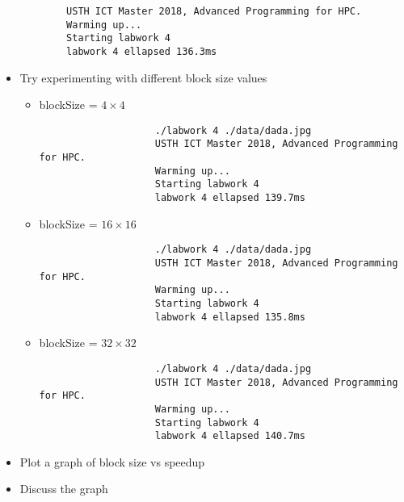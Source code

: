 \documentclass[10pt, a4paper]{article}
\begin{document}
\begin{itemize}
\begin{verbatim}
        USTH ICT Master 2018, Advanced Programming for HPC.
        Warming up...
        Starting labwork 4
        labwork 4 ellapsed 136.3ms
    \end{verbatim}
    
    \item Try experimenting with different block size values
        \begin{itemize}
            \item blockSize = $4\times4$
                \begin{verbatim}
                    ./labwork 4 ./data/dada.jpg
                    USTH ICT Master 2018, Advanced Programming for HPC.
                    Warming up...
                    Starting labwork 4
                    labwork 4 ellapsed 139.7ms
                \end{verbatim}
            \item blockSize = $16\times16$
                \begin{verbatim}
                    ./labwork 4 ./data/dada.jpg
                    USTH ICT Master 2018, Advanced Programming for HPC.
                    Warming up...
                    Starting labwork 4
                    labwork 4 ellapsed 135.8ms
                \end{verbatim}
            \item blockSize = $32\times32$
                \begin{verbatim}
                    ./labwork 4 ./data/dada.jpg
                    USTH ICT Master 2018, Advanced Programming for HPC.
                    Warming up...
                    Starting labwork 4
                    labwork 4 ellapsed 140.7ms
                \end{verbatim}
        \end{itemize}
        
        
    
    \item Plot a graph of block size vs speedup
    \item Discuss the graph
\end{itemize}



\begin{verbatim}
    
\end{verbatim}
\end{document}
